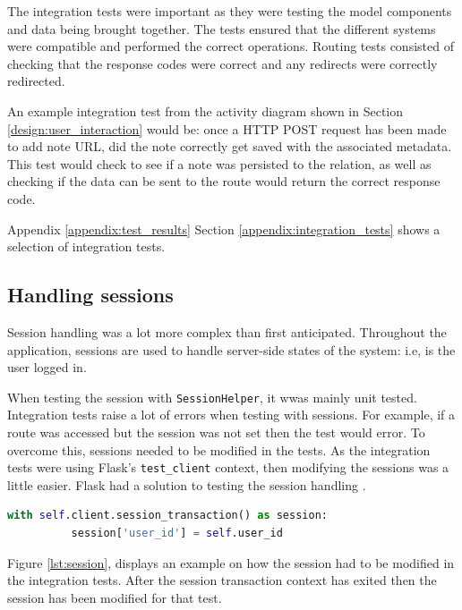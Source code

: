 The integration tests were important as they were testing the model components and data being brought together. The tests ensured that the different systems were compatible and performed the correct operations. Routing tests consisted of checking that the response codes were correct and any redirects were correctly redirected.

An example integration test from the activity diagram shown in Section \ref{design:user_interaction} would be: once a HTTP POST request has been made to add note URL, did the note correctly get saved with the associated metadata. This test would check to see if a note was persisted to the relation, as well as checking if the data can be sent to the route would return the correct response code.

Appendix \ref{appendix:test_results} Section \ref{appendix:integration_tests} shows a selection of integration tests.

\subsection{Handling sessions}
Session handling was a lot more complex than first anticipated. Throughout the application, sessions are used to handle server-side states of the system: i.e, is the user logged in.

When testing the session with \texttt{SessionHelper}, it wwas mainly unit tested. Integration tests raise a lot of errors when testing with sessions. For example, if a route was accessed but the session was not set then the test would error. To overcome this, sessions needed to be modified in the tests. As the integration tests were using Flask's \texttt{test\_client} context, then modifying the sessions was a little easier. Flask had a solution to testing the session handling \cite{citeulike:14020609}.

\begin{lstlisting}[language=python, label={lst:session}, breaklines, columns=fullflexible, keywordstyle=\color{blue}, basicstyle=\normalsize\ttfamily, caption= {An example of how sessions were handled and modified in the tests.}]
  with self.client.session_transaction() as session:
          session['user_id'] = self.user_id
\end{lstlisting}

Figure \ref{lst:session}, displays an example on how the session had to be modified in the integration tests. After the session transaction context has exited then the session has been modified for that test.

